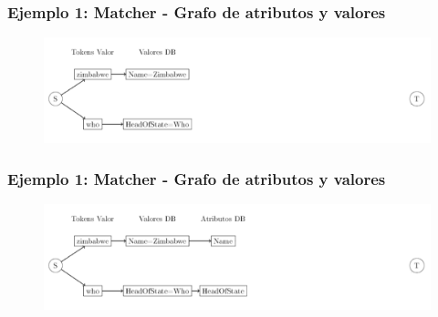 \begin{frame}
\frametitle{Ejemplo 1: Matcher - Grafo de atributos y valores}
\begin{figure}
  \centering
    \includegraphics[scale=.33]{graficos/presentacion/ejemplo-grafo-matcher-1-4}
\end{figure}
\end{frame}

\begin{frame}
\frametitle{Ejemplo 1: Matcher - Grafo de atributos y valores}
\begin{figure}
  \centering
    \includegraphics[scale=.33]{graficos/presentacion/ejemplo-grafo-matcher-1-5}
\end{figure}
\end{frame}

